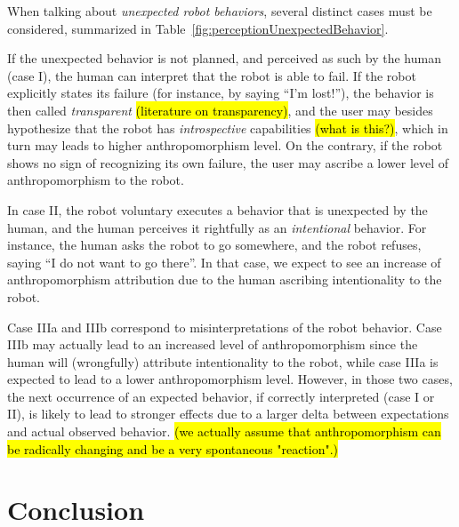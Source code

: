 \documentclass[lettersize, apacite, twoside, HRI]{apa_HRI}
\begin{document}
When talking about \emph{unexpected robot behaviors}, several distinct cases
must be considered, summarized in Table~\ref{fig:perceptionUnexpectedBehavior}.

If the unexpected behavior is not planned, and perceived as such by the human
(case I), the human can interpret that the robot is able to fail. If the robot
explicitly states its failure (for instance, by saying ``I'm lost!''), the
behavior is then called \emph{transparent}  \hl{(literature on transparency)}, and the
user may besides hypothesize that the robot has \emph{introspective}
capabilities \hl{(what is this?)}, which in turn may leads to higher anthropomorphism level.  On the
contrary, if the robot shows no sign of recognizing its own failure, the user
may ascribe a lower level of anthropomorphism to the robot.

In case II, the robot voluntary executes a behavior that is unexpected by the
human, and the human perceives it rightfully as an \emph{intentional} behavior.
For instance, the human asks the robot to go somewhere, and the robot refuses,
saying ``I do not want to go there''. In that case, we expect to see an
increase of anthropomorphism attribution due to the human ascribing
intentionality to the robot.

Case IIIa and IIIb correspond to misinterpretations of the robot behavior. Case
IIIb may actually lead to an increased level of anthropomorphism since the human
will (wrongfully) attribute intentionality to the robot, while case IIIa is
expected to lead to a lower anthropomorphism level.  However, in those two
cases, the next occurrence of an expected behavior, if correctly interpreted
(case I or II), is likely to lead to stronger effects due to a larger delta
between expectations and actual observed behavior. \hl{(we actually assume that anthropomorphism can be radically changing and be a very spontaneous "reaction".)}




%
%
%
%
%
%


\section{Conclusion}
\label{sec:9}
\end{document}

